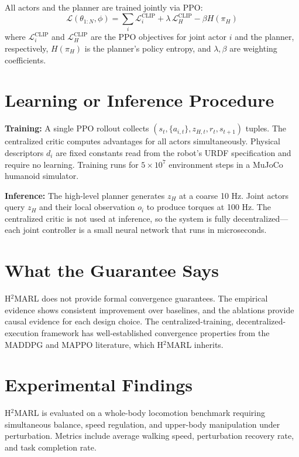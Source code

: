\documentclass[10pt,twocolumn]{article}
\begin{document}
All actors and the planner are trained jointly via PPO:
\begin{equation}
\mathcal{L}(\theta_{1:N},\phi) = \sum_i \mathcal{L}^{\text{CLIP}}_i + \lambda\, \mathcal{L}^{\text{CLIP}}_H - \beta H(\pi_H)
\end{equation}
where $\mathcal{L}^{\text{CLIP}}_i$ and $\mathcal{L}^{\text{CLIP}}_H$ are the PPO objectives for joint actor $i$ and the planner, respectively, $H(\pi_H)$ is the planner's policy entropy, and $\lambda, \beta$ are weighting coefficients.

\section{Learning or Inference Procedure}

\textbf{Training:} A single PPO rollout collects $(s_t, \{a_{i,t}\}, z_{H,t}, r_t, s_{t+1})$ tuples.
The centralized critic computes advantages for all actors simultaneously.
Physical descriptors $d_i$ are fixed constants read from the robot's URDF specification and require no learning.
Training runs for $5\times10^7$ environment steps in a MuJoCo humanoid simulator.

\textbf{Inference:} The high-level planner generates $z_H$ at a coarse 10 Hz.
Joint actors query $z_H$ and their local observation $o_i$ to produce torques at 100 Hz.
The centralized critic is not used at inference, so the system is fully decentralized---each joint controller is a small neural network that runs in microseconds.

\section{What the Guarantee Says}

H$^2$MARL does not provide formal convergence guarantees.
The empirical evidence shows consistent improvement over baselines, and the ablations provide causal evidence for each design choice.
The centralized-training, decentralized-execution framework has well-established convergence properties from the MADDPG and MAPPO literature, which H$^2$MARL inherits.

\section{Experimental Findings}

H$^2$MARL is evaluated on a whole-body locomotion benchmark requiring simultaneous balance, speed regulation, and upper-body manipulation under perturbation.
Metrics include average walking speed, perturbation recovery rate, and task completion rate.
\end{document}
